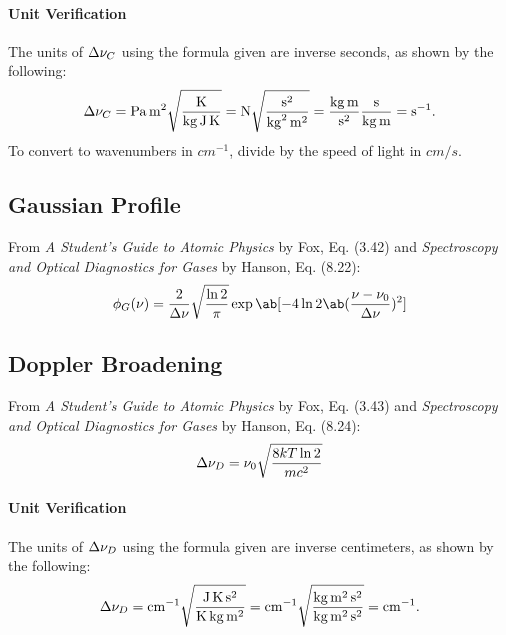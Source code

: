 \documentclass[11pt, twoside, fleqn]{report}
\begin{document}
    \paragraph{Unit Verification}

    The units of $\adif{\nu}_C$ using the formula given are inverse seconds, as shown by the following:
    \begin{equation*}
        \adif{\nu}_C = \unit{Pa.m^2}\sqrt{\frac{\unit{K}}{\unit{kg.J.K}}} = \unit{N}\sqrt{\frac{\unit{s^2}}{\unit{kg^2.m^2}}} = \frac{\unit{kg.m}}{\unit{s^2}}\frac{\unit{s}}{\unit{kg.m}} = \unit{s^{-1}}.
    \end{equation*}
    To convert to wavenumbers in $\unit{cm^{-1}}$, divide by the speed of light in $\unit{cm/s}$.

    \subsection{Gaussian Profile}

    From \textit{A Student's Guide to Atomic Physics} by Fox, Eq. (3.42) and \textit{Spectroscopy and Optical Diagnostics for Gases} by Hanson, Eq. (8.22):
    \begin{equation*}
        \phi_G(\nu) = \frac{2}{\adif{\nu}}\sqrt{\frac{\ln{2}}{\pi}}\exp\ab[-4\ln{2}\ab(\frac{\nu - \nu_0}{\adif{\nu}})^2]
    \end{equation*}

    \subsection{Doppler Broadening}

    From \textit{A Student's Guide to Atomic Physics} by Fox, Eq. (3.43) and \textit{Spectroscopy and Optical Diagnostics for Gases} by Hanson, Eq. (8.24):
    \begin{equation*}
        \adif{\nu}_D = \nu_0\sqrt{\frac{8kT\ln{2}}{mc^2}}
    \end{equation*}

    \paragraph{Unit Verification}

    The units of $\adif{\nu}_D$ using the formula given are inverse centimeters, as shown by the following:
    \begin{equation*}
        \adif{\nu}_D = \unit{cm^{-1}}\sqrt{\frac{\unit{J.K.s^2}}{\unit{K.kg.m^2}}} = \unit{cm^{-1}}\sqrt{\frac{\unit{kg.m^2.s^2}}{\unit{kg.m^2.s^2}}} = \unit{cm^{-1}}.
    \end{equation*}
\end{document}
